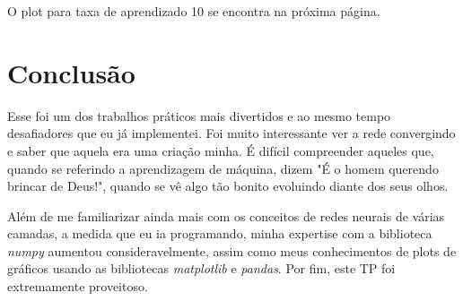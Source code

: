 \documentclass[a4paper, 11pt]{article}
\begin{document}
O plot para taxa de aprendizado 10 se encontra na próxima página.



\section{Conclusão}

Esse foi um dos trabalhos práticos mais divertidos e ao mesmo tempo desafiadores que eu já implementei. Foi muito interessante ver a rede convergindo e saber que aquela era uma criação minha. É difícil compreender aqueles que, quando se referindo a aprendizagem de máquina, dizem "É o homem querendo brincar de Deus!", quando se vê algo tão bonito evoluindo diante dos seus olhos.

Além de me familiarizar ainda mais com os conceitos de redes neurais de várias camadas, a medida que eu ia programando, minha expertise com a biblioteca \textit{numpy} aumentou consideravelmente, assim como meus conhecimentos de plots de gráficos usando as bibliotecas \textit{matplotlib} e \textit{pandas}. Por fim, este TP foi extremamente proveitoso.
\end{document}
